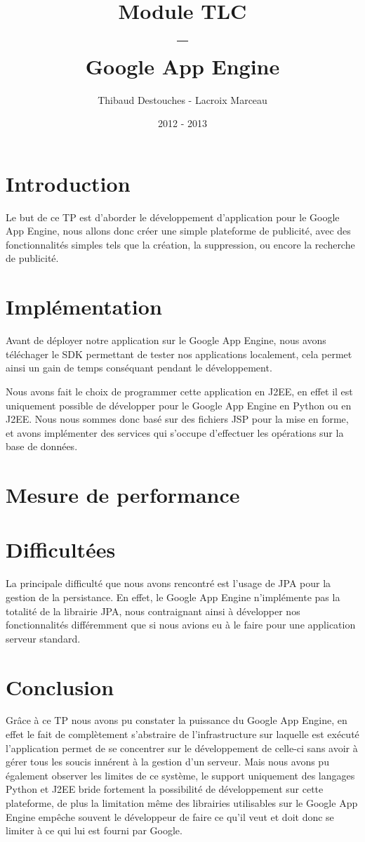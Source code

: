 \documentclass{article}
\title{Module TLC
\\
--
\\
Google App Engine}
\author{Thibaud Destouches - Lacroix Marceau}
\date{2012 - 2013}
\begin{document}
\begin{titlepage}
\maketitle
\tableofcontents
\end{titlepage}

\newpage
\section{Introduction}

Le but de ce TP est d’aborder le développement d'application pour le Google App Engine, nous allons donc créer une simple plateforme de publicité, avec des fonctionnalités simples tels que la création, la suppression, ou encore la recherche de publicité.

\section{Implémentation}
Avant de déployer notre application sur le Google App Engine, nous avons téléchager le SDK permettant de tester nos applications localement, cela permet ainsi un gain de temps conséquant pendant le développement.

Nous avons fait le choix de programmer cette application en J2EE, en effet il est uniquement possible de développer pour le Google App Engine en Python ou en J2EE. Nous nous sommes donc basé sur des fichiers JSP pour la mise en forme, et avons implémenter des services qui s'occupe d'effectuer les opérations sur la base de données.

\section{Mesure de performance}

\section{Difficultées}
La principale difficulté que nous avons rencontré est l'usage de JPA pour la gestion de la persistance. En effet, le Google App Engine n'implémente pas la totalité de la librairie JPA, nous contraignant ainsi à développer nos fonctionnalités différemment que si nous avions eu à le faire pour une application serveur standard. 


\section{Conclusion}
Grâce à ce TP nous avons pu constater la puissance du Google App Engine, en effet le fait de complètement s'abstraire de l'infrastructure sur laquelle est exécuté l'application permet de se concentrer sur le développement de celle-ci sans avoir à gérer tous les soucis innérent à la gestion d'un serveur. Mais nous avons pu également observer les limites de ce système, le support uniquement des langages Python et J2EE bride fortement la possibilité de développement sur cette plateforme, de plus la limitation même des librairies utilisables sur le Google App Engine empêche souvent le développeur de faire ce qu'il veut et doit donc se limiter à ce qui lui est fourni par Google.
\end{document}
